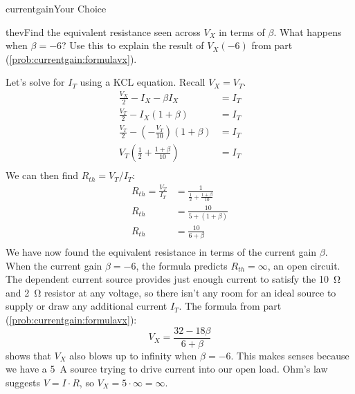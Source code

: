 \begin{mainquestion}{currentgain}{Your Choice}
\begin{partquestion}{thev}{Find the equivalent resistance seen across $V_X$ in terms of $\beta$. What happens when $\beta = -6$? Use this to explain the result of $V_X(-6)$ from part (\cref{prob:currentgain:formulavx}).}
\begin{answer}
Let's solve for $I_T$ using a KCL equation. Recall $V_X = V_T$.
\begin{align*}
    \frac{V_X}{2} - I_X - \beta I_X &= I_T \\
    \frac{V_T}{2} - I_X(1+\beta) &= I_T \\
    \frac{V_T}{2} - \left(-\frac{V_T}{10}\right)(1+\beta) &= I_T \\
    V_T\left(\frac{1}{2} + \frac{1+\beta}{10}\right) &= I_T \\
\end{align*}
We can then find $R_{th} = V_T/I_T$:
\begin{align*}
    R_{th} = \frac{V_T}{I_T} &= \frac{1}{\frac{1}{2} + \frac{1+\beta}{10}} \\
    R_{th} &= \frac{10}{5 + (1+\beta)} \\
    R_{th} &= \frac{10}{6+\beta} \\
\end{align*}
We have now found the equivalent resistance in terms of the current gain $\beta$. When the current gain $\beta = -6$, the formula predicts $R_{th} = \infty$, an open circuit. The dependent current source provides just enough current to satisfy the \qty{10}{\ohm} and \qty{2}{\ohm} resistor at any voltage, so there isn't any room for an ideal source to supply or draw any additional current $I_T$. The formula from part (\cref{prob:currentgain:formulavx}):
\[
V_X = \frac{32 - 18\beta}{6+\beta}
\]
shows that $V_X$ also blows up to infinity when $\beta = -6$. This makes senses because we have a \qty{5}{\ampere} source trying to drive current into our open load. Ohm's law suggests $V = I\cdot R$, so $V_X = 5 \cdot \infty = \infty$.
    
\end{answer}
\end{partquestion}

\end{mainquestion}
